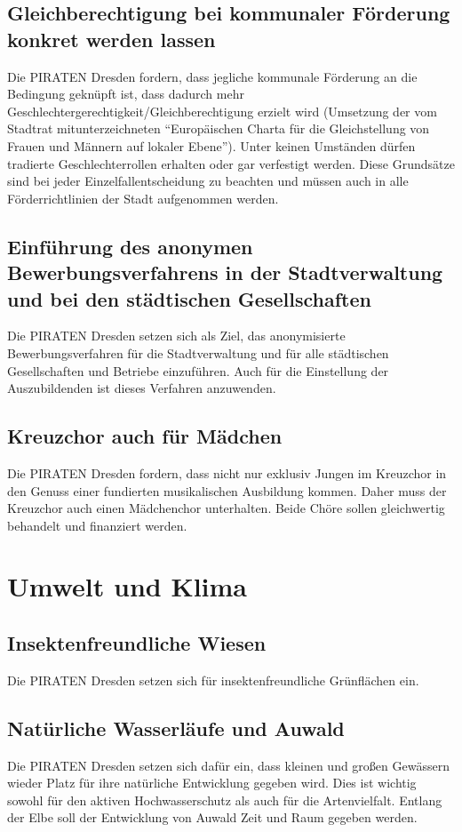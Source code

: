 \documentclass[a4paper, 11pt]{article}
\begin{document}
\subsection{Gleichberechtigung bei kommunaler Förderung konkret werden lassen}
Die PIRATEN Dresden fordern, dass jegliche kommunale Förderung an die Bedingung geknüpft ist, dass dadurch mehr Geschlechtergerechtigkeit/Gleichberechtigung erzielt wird (Umsetzung der vom Stadtrat mitunterzeichneten ``Europäischen Charta für die Gleichstellung von Frauen und Männern auf lokaler Ebene''). Unter keinen Umständen dürfen tradierte Geschlechterrollen erhalten oder gar verfestigt werden. Diese Grundsätze sind bei jeder Einzelfallentscheidung zu beachten und müssen auch in alle Förderrichtlinien der Stadt aufgenommen werden.



\subsection{Einführung des anonymen Bewerbungsverfahrens in der Stadtverwaltung und bei den städtischen Gesellschaften}
Die PIRATEN Dresden setzen sich als Ziel, das anonymisierte Bewerbungsverfahren für die Stadtverwaltung und für alle städtischen Gesellschaften und Betriebe einzuführen. Auch für die Einstellung der Auszubildenden ist dieses Verfahren anzuwenden.


\subsection{Kreuzchor auch für Mädchen}
Die PIRATEN Dresden fordern, dass nicht nur exklusiv Jungen im Kreuzchor in den Genuss einer fundierten musikalischen Ausbildung kommen. Daher muss der Kreuzchor auch einen Mädchenchor unterhalten. Beide Chöre sollen gleichwertig behandelt und finanziert werden.


\section{Umwelt und Klima}

\subsection{Insektenfreundliche Wiesen}
Die PIRATEN Dresden setzen sich für insektenfreundliche Grünflächen ein.


\subsection{Natürliche Wasserläufe und Auwald}
Die PIRATEN Dresden setzen sich dafür ein, dass kleinen und großen Gewässern wieder Platz für ihre natürliche Entwicklung gegeben wird. Dies ist wichtig sowohl für den aktiven Hochwasserschutz als auch für die Artenvielfalt. Entlang der Elbe soll der Entwicklung von Auwald Zeit und Raum gegeben werden.
\end{document}
